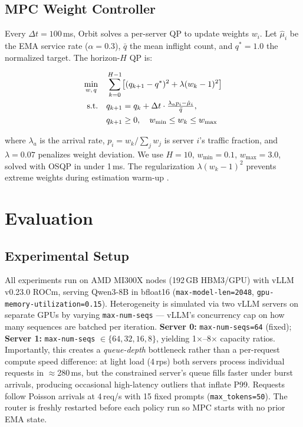 \documentclass[blind]{gtac}
\begin{document}
\subsection{MPC Weight Controller}

Every $\Delta t = 100$\,ms, Orbit solves a per-server QP to update weights
$w_i$. Let $\hat{\mu}_i$ be the EMA service rate ($\alpha = 0.3$),
$\bar{q}$ the mean inflight count, and $q^* = 1.0$ the normalized target.
The horizon-$H$ QP is:

\begin{align}
\min_{w,\, q} \quad & \sum_{k=0}^{H-1} \!\left[ (q_{k+1} - q^*)^2
    + \lambda(w_k - 1)^2 \right] \label{eq:mpc} \\
\text{s.t.} \quad
  & q_{k+1} = q_k + \Delta t \cdot
    \tfrac{\lambda_a p_i - \hat{\mu}_i}{\bar{q}},\notag\\
  & q_{k+1} \geq 0,\quad w_{\min} \leq w_k \leq w_{\max} \notag
\end{align}

\noindent where $\lambda_a$ is the arrival rate, $p_i = w_k/\sum_j w_j$
is server $i$'s traffic fraction, and $\lambda=0.07$ penalizes weight
deviation. We use $H=10$, $w_{\min}=0.1$, $w_{\max}=3.0$, solved with
OSQP \cite{osqp} in under 1\,ms. The regularization $\lambda(w_k-1)^2$
prevents extreme weights during estimation warm-up \cite{mpc_book}.

\section{Evaluation}
\label{sec:results}

\subsection{Experimental Setup}

All experiments run on AMD MI300X nodes (192\,GB HBM3/GPU) with
vLLM v0.23.0 ROCm, serving Qwen3-8B in bfloat16 (\texttt{max-model-len=2048},
\texttt{gpu-memory-utilization=0.15}). Heterogeneity is simulated via two vLLM servers on separate GPUs
by varying \texttt{max-num-seqs} --- vLLM's concurrency cap on how
many sequences are batched per iteration.
\textbf{Server 0:} \texttt{max-num-seqs=64} (fixed);
\textbf{Server 1:} \texttt{max-num-seqs} $\in \{64,32,16,8\}$,
yielding 1$\times$--8$\times$ capacity ratios.
Importantly, this creates a \emph{queue-depth} bottleneck rather than
a per-request compute speed difference: at light load (4\,rps) both
servers process individual requests in $\approx$280\,ms, but the
constrained server's queue fills faster under burst arrivals, producing
occasional high-latency outliers that inflate P99.
Requests follow Poisson arrivals at 4\,req/s with 15 fixed prompts
(\texttt{max\_tokens=50}). The router is freshly restarted before each
policy run so MPC starts with no prior EMA state.
\end{document}
